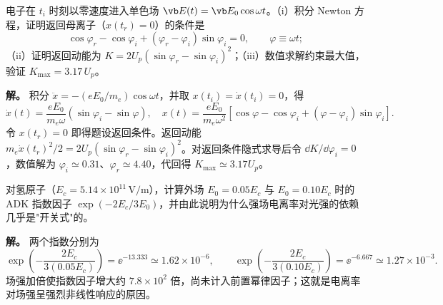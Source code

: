 \par
\begin{workedexample}[经典返回条件与 $3.17\,U_p$]
电子在 $t_i$ 时刻以零速度进入单色场 $\vb E(t)=\vb E_0\cos\omega t$。（i）积分 Newton 方程，证明返回母离子（$x(t_r)=0$）的条件是
\begin{equation*}
\cos\varphi_r-\cos\varphi_i+(\varphi_r-\varphi_i)\sin\varphi_i=0,
\qquad \varphi\equiv\omega t;
\end{equation*}
（ii）证明返回动能为 $K=2U_p(\sin\varphi_r-\sin\varphi_i)^2$；（iii）数值求解约束最大值，验证 $K_{\max}=3.17\,U_p$。

\textbf{解。} 积分 \(\ddot x=-(eE_0/m_e)\cos\omega t\)，并取 \(x(t_i)=\dot x(t_i)=0\)，得
\[
\dot x(t)=\frac{eE_0}{m_e\omega}(\sin\varphi_i-\sin\varphi),\quad
x(t)=\frac{eE_0}{m_e\omega^2}[\cos\varphi-\cos\varphi_i+(\varphi-\varphi_i)\sin\varphi_i].
\]
令 \(x(t_r)=0\) 即得题设返回条件。返回动能 \(m_e\dot x(t_r)^2/2=2U_p(\sin\varphi_r-\sin\varphi_i)^2\)。对返回条件隐式求导后令 \(\dd K/\dd\varphi_i=0\)，数值解为 \(\varphi_i\simeq0.31\)、\(\varphi_r\simeq4.40\)，代回得 \(K_{\max}\simeq3.17U_p\)。
\end{workedexample}
\par

\par
\begin{workedexample}
对氢原子（$E_c=5.14\times10^{11}\,\mathrm{V/m}$），计算外场 $E_0=0.05E_c$ 与 $E_0=0.10E_c$ 时的 ADK 指数因子 $\exp(-2E_c/3E_0)$，并由此说明为什么强场电离率对光强的依赖几乎是"开关式"的。

\textbf{解。} 两个指数分别为
\[
\exp\!\left(-\frac{2E_c}{3(0.05E_c)}\right)=\ee^{-13.333}\simeq1.62\times10^{-6},\qquad
\exp\!\left(-\frac{2E_c}{3(0.10E_c)}\right)=\ee^{-6.667}\simeq1.27\times10^{-3}.
\]
场强加倍使指数因子增大约 \(7.8\times10^2\) 倍，尚未计入前置幂律因子；这就是电离率对场强呈强烈非线性响应的原因。
\end{workedexample}
\par
